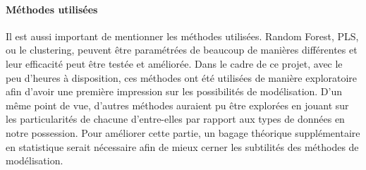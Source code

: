 \paragraph{Méthodes utilisées} Il est aussi important de mentionner les méthodes utilisées. Random Forest, PLS, ou le clustering, peuvent être paramétrées de beaucoup de manières différentes et leur efficacité peut être testée et améliorée. Dans le cadre de ce projet, avec le peu d'heures à disposition, ces méthodes ont été utilisées de manière exploratoire afin d'avoir une première impression sur les possibilités de modélisation. D'un même point de vue, d'autres méthodes auraient pu être explorées en jouant sur les particularités de chacune d'entre-elles par rapport aux types de données en notre possession. Pour améliorer cette partie, un bagage théorique supplémentaire en statistique serait nécessaire afin de mieux cerner les subtilités des méthodes de modélisation.  \\

\noindent 


 













